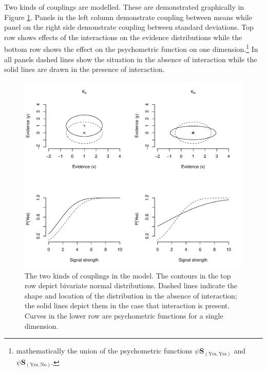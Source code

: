 \documentclass{article}\usepackage{knitr}
\begin{document}
Two kinds of couplings are modelled. These are demonstrated graphically  in Figure \ref{fig:grt_couplings}. Panels in the left column demonstrate coupling between means while panel on the right side demonstrate coupling between standard deviations. Top row shows effects of the interactions on the evidence distributions while the bottom row shows the effect on the psychometric function on one dimension.\footnote{mathematically the union of the psychometric functions $\psi{\bm{S}}_{(\text{Yes}, \text{Yes})}$ and $\psi{\bm{S}}_{(\text{Yes}, \text{No})}$.} In all panels dashed lines show the situation in the absence of interaction while the solid lines are drawn in the presence of interaction. 

\begin{figure}
\begin{center}
\begin{knitrout}
\color{fgcolor}
\includegraphics[width=\maxwidth]{figure/unnamed-chunk-10-1} 

\end{knitrout}
\end{center}
\caption{The two kinds of couplings in the model. The contours in the top row depict bivariate normal distributions. Dashed lines indicate the shape and location of the distribution in the absence of interaction; the solid lines depict them in the case that interaction is present. Curves in the lower row are psychometric functions for a single dimension.}
\label{fig:grt_couplings}
\end{figure}
\end{document}
